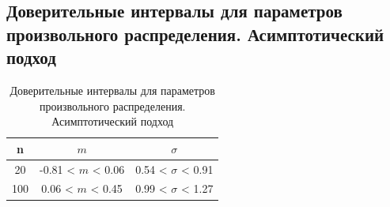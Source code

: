 \documentclass[../main.tex]{subfiles}
\begin{document}
\subsection{Доверительные интервалы для параметров произвольного распределения. Асимптотический подход}
	\begin{table}[H]
	    \centering
	    \begin{tabular}{| c | c | c |}
	    \hline
	       n    &  $m$  & $\sigma$\\ \hline
	        20  &  -0.81 < $m$ < 0.06 & 0.54 < $\sigma$ < 0.91 \\ \hline
	       100   &  0.06 < $m$ < 0.45 & 0.99 < $\sigma$ < 1.27 \\
	   \hline
	    \end{tabular}
	    \caption{Доверительные интервалы для параметров произвольного распределения. Асимптотический подход}
	    \label{tab:interv_asimpt}
	\end{table}
\end{document}
